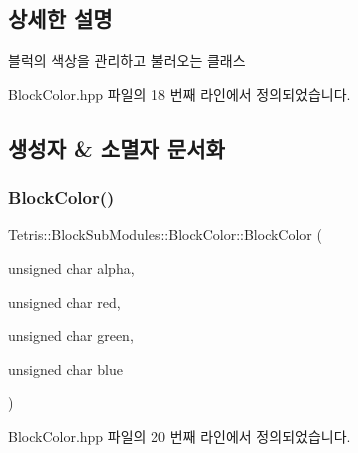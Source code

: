 \subsection{상세한 설명}
블럭의 색상을 관리하고 불러오는 클래스 

Block\+Color.\+hpp 파일의 18 번째 라인에서 정의되었습니다.



\subsection{생성자 \& 소멸자 문서화}
\mbox{\label{class_tetris_1_1_block_sub_modules_1_1_block_color_abb929df07c6b378e31d76b7298eb9e12}} 
\subsubsection{\texorpdfstring{Block\+Color()}{BlockColor()}\hspace{0.1cm}{\footnotesize\ttfamily [1/2]}}
{\footnotesize\ttfamily Tetris\+::\+Block\+Sub\+Modules\+::\+Block\+Color\+::\+Block\+Color (\begin{DoxyParamCaption}\item[{unsigned char}]{alpha,  }\item[{unsigned char}]{red,  }\item[{unsigned char}]{green,  }\item[{unsigned char}]{blue }\end{DoxyParamCaption})\hspace{0.3cm}{\ttfamily [inline]}}



Block\+Color.\+hpp 파일의 20 번째 라인에서 정의되었습니다.


